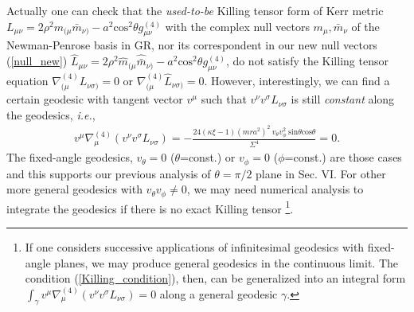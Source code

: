 \documentclass[preprint,aps,tightenlines,showkeys,nofootinbib,superscriptaddress]{revtex4}
\newcommand{\beq}{\begin{eqnarray}}
\newcommand{\eeq}{\end{eqnarray}}
\newcommand{\ga}{{\gamma}}
\newcommand{\ka}{\kappa}
\newcommand{\m}{{\mu}}
\newcommand{\n}{{\nu}}
\newcommand{\si}{{\sigma}}
\newcommand{\Si}{{\Sigma}}
\newcommand{\f}{\frac}
\begin{document}
Actually one can check that the {\it used-to-be} Killing tensor form of Kerr metric $L_{\m \n}=2 \rho^2 m_{(\m} \bar{m}_{\n)}-a^2 \mbox{cos}^2 \theta g^{(4)}_{\m \n}$ with the complex null vectors $m_{\m}, \bar{m}_{\n}$ of the Newman-Penrose basis in GR, nor its correspondent in our new null vectors (\ref{null_new}) $\widehat{L}_{\m \n}=2 \rho^2 \widehat{m}_{(\m} \widehat{\bar{m}}_{\n)}-a^2 \mbox{cos}^2 \theta g^{(4)}_{\m \n}$, do not satisfy the Killing tensor equation $\nabla^{(4)}_{(\m} L^{}_{\n \si)}=0$ or $\nabla^{(4)}_{(\m} \widehat{L}^{}_{\n \si)}=0$. However, interestingly, we can find a certain geodesic with tangent vector $v^{\m}$ such that $v^{\n} v^{\si}L_{\n \si}$ is still {\it constant} along the geodesics, {\it i.e.},
\beq
v^{\m} \nabla^{(4)}_{\m} (v^{\n}v^{\si} L_{\n \si})=-\f{24 (\ka \xi-1) (mra^2)^2~ v_{\theta} v_{\phi}^2~ \mbox{sin}\theta \mbox{cos}\theta}{\Si^4}=0.
\label{Killing_condition}
\eeq
The fixed-angle geodesics, $v_{\theta}=0$ ($\theta$=const.) or $v_{\phi}=0$ ($\phi$=const.) are those cases and this supports our previous analysis of $\theta=\pi/2$ plane in Sec. VI. For other more general geodesics with $v_{\theta}v_{\phi} \neq 0$, we may need numerical analysis to integrate the geodesics if there is no exact Killing tensor \footnote{If one considers successive applications of infinitesimal geodesics with fixed-angle planes, we may produce  general geodesics in the continuous limit. The condition (\ref{Killing_condition}), then, can be generalized into an integral form $\int_{\ga}v^{\m} \nabla^{(4)}_{\m} (v^{\n}v^{\si} L_{\n \si})=0$ along a general geodesic $\ga$.}.
\end{document}

